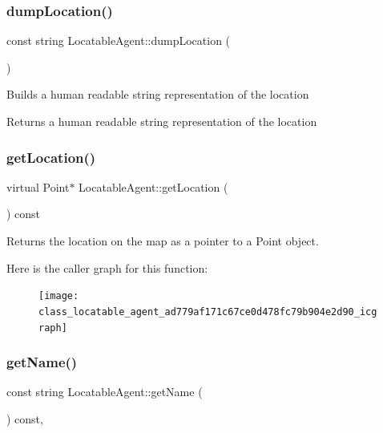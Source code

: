 \subsubsection{\texorpdfstring{dump\+Location()}{dumpLocation()}}
{\footnotesize\ttfamily const string Locatable\+Agent\+::dump\+Location (\begin{DoxyParamCaption}{ }\end{DoxyParamCaption})}

Builds a human readable string representation of the location \begin{DoxyReturn}{Returns}
a human readable string representation of the location 
\end{DoxyReturn}
\mbox{\label{class_locatable_agent_ad779af171c67ce0d478fc79b904e2d90}} 
\subsubsection{\texorpdfstring{get\+Location()}{getLocation()}}
{\footnotesize\ttfamily virtual Point$\ast$ Locatable\+Agent\+::get\+Location (\begin{DoxyParamCaption}{ }\end{DoxyParamCaption}) const\hspace{0.3cm}{\ttfamily [virtual]}}

\begin{DoxyReturn}{Returns}
the location on the map as a pointer to a Point object. 
\end{DoxyReturn}
Here is the caller graph for this function\+:\nopagebreak
\begin{figure}[H]
\begin{center}
\leavevmode
\texttt{[image: class\_locatable\_agent\_ad779af171c67ce0d478fc79b904e2d90\_icgraph]}
\end{center}
\end{figure}
\mbox{\label{class_locatable_agent_a754105958bb672744b525538f1584a7b}} 
\subsubsection{\texorpdfstring{get\+Name()}{getName()}}
{\footnotesize\ttfamily const string Locatable\+Agent\+::get\+Name (\begin{DoxyParamCaption}{ }\end{DoxyParamCaption}) const\hspace{0.3cm}{\ttfamily [override]}, {\ttfamily [virtual]}}

